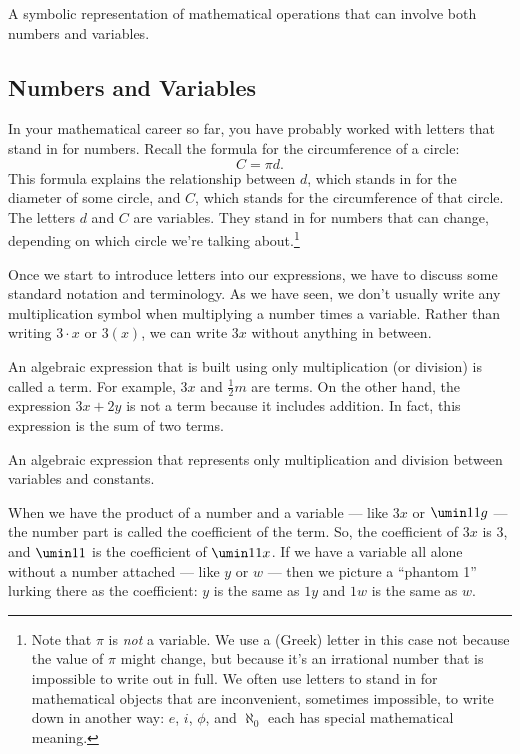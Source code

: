 \begin{boxeddef}
A symbolic representation of mathematical operations that can involve both numbers and variables.
\end{boxeddef}

\subsection{Numbers and Variables}

In your mathematical career so far, you have probably worked with letters that stand in for numbers. Recall the formula for the circumference of a circle: \[C = \pi d.\]
This formula explains the relationship between $d$, which stands in for the diameter of some circle, and $C$, which stands for the circumference of that circle. The letters $d$ and $C$ are variables. They stand in for numbers that can change, depending on which circle we're talking about.\footnote{Note that $\pi$ is \textit{not} a variable. We use a (Greek) letter in this case not because the value of $\pi$ might change, but because it's an irrational number that is impossible to write out in full. We often use letters to stand in for mathematical objects that are inconvenient, sometimes impossible, to write down in another way: $e$, $i$, $\phi$, and $\aleph_0$ each has special mathematical meaning.}

Once we start to introduce letters into our expressions, we have to discuss some standard notation and terminology. As we have seen, we don't usually write any multiplication symbol when multiplying a number times a variable. Rather than writing $3\cdot x$ or $3(x)$, we can write $3x$ without anything in between.

An algebraic expression that is built using only multiplication (or division) is called a \gls{term}. For example, $3x$ and $\frac{1}{2}m$ are terms. On the other hand, the expression $3x+2y$ is not a term because it includes addition. In fact, this expression is the sum of two terms.

\begin{boxeddef}[Term]
An algebraic expression that represents only multiplication and division between variables and constants.
\end{boxeddef}

When we have the product of a number and a variable --- like $3x$ or $\umin11g$ --- the number part is called the \gls{coefficient} of the term. So, the coefficient of $3x$ is 3, and $\umin11$ is the coefficient of $\umin11x$. If we have a variable all alone without a number attached --- like $y$ or $w$ --- then we picture a ``phantom 1'' lurking there as the coefficient: $y$ is the same as $1y$ and $1w$ is the same as $w$.

